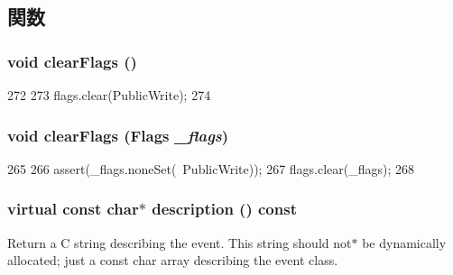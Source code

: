 \subsection{関数}
\hypertarget{classEvent_a97d5bfe661fa4e01c6895533d668d2d1}{
\subsubsection[{clearFlags}]{\setlength{\rightskip}{0pt plus 5cm}void clearFlags ()}}
\label{classEvent_a97d5bfe661fa4e01c6895533d668d2d1}



\begin{DoxyCode}
272     {
273         flags.clear(PublicWrite);
274     }
\end{DoxyCode}
\hypertarget{classEvent_a3d05c8ddda9348a05704f89a90bb6169}{
\subsubsection[{clearFlags}]{\setlength{\rightskip}{0pt plus 5cm}void clearFlags ({\bf Flags} {\em \_\-flags})}}
\label{classEvent_a3d05c8ddda9348a05704f89a90bb6169}



\begin{DoxyCode}
265     {
266         assert(_flags.noneSet(~PublicWrite));
267         flags.clear(_flags);
268     }
\end{DoxyCode}
\hypertarget{classEvent_a130ddddf003422b413e2e891b1b80e8f}{
\subsubsection[{description}]{\setlength{\rightskip}{0pt plus 5cm}virtual const char$\ast$ description () const}}
\label{classEvent_a130ddddf003422b413e2e891b1b80e8f}
Return a C string describing the event. This string should not$\ast$ be dynamically allocated; just a const char array describing the event class. 


